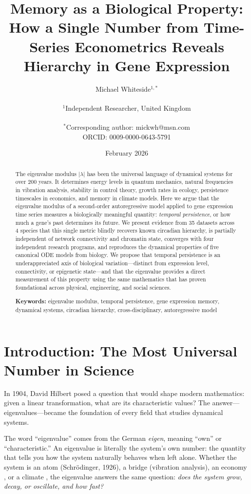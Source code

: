 \documentclass[11pt,letterpaper]{article}
\title{\textbf{Memory as a Biological Property: How a Single Number from Time-Series Econometrics Reveals Hierarchy in Gene Expression}}
\author{
Michael Whiteside$^{1,*}$ \\
\\
$^1$Independent Researcher, United Kingdom \\
\\
$^*$Corresponding author: mickwh@msn.com \\
ORCID: 0009-0000-0643-5791
}
\date{February 2026}
\begin{document}
\maketitle

\begin{abstract}
\noindent The eigenvalue modulus $|\lambda|$ has been the universal language of dynamical systems for over 200 years. It determines energy levels in quantum mechanics, natural frequencies in vibration analysis, stability in control theory, growth rates in ecology, persistence timescales in economics, and memory in climate models. Here we argue that the eigenvalue modulus of a second-order autoregressive model applied to gene expression time series measures a biologically meaningful quantity: \textit{temporal persistence}, or how much a gene's past determines its future. We present evidence from 35 datasets across 4 species that this single metric blindly recovers known circadian hierarchy, is partially independent of network connectivity and chromatin state, converges with four independent research programs, and reproduces the dynamical properties of five canonical ODE models from biology. We propose that temporal persistence is an underappreciated axis of biological variation---distinct from expression level, connectivity, or epigenetic state---and that the eigenvalue provides a direct measurement of this property using the same mathematics that has proven foundational across physical, engineering, and social sciences.

\noindent\textbf{Keywords:} eigenvalue modulus, temporal persistence, gene expression memory, dynamical systems, circadian hierarchy, cross-disciplinary, autoregressive model
\end{abstract}

\section{Introduction: The Most Universal Number in Science}

In 1904, David Hilbert posed a question that would shape modern mathematics: given a linear transformation, what are its characteristic values? The answer---eigenvalues---became the foundation of every field that studies dynamical systems.

The word ``eigenvalue'' comes from the German \textit{eigen}, meaning ``own'' or ``characteristic.'' An eigenvalue is literally the system's own number: the quantity that tells you how the system naturally behaves when left alone. Whether the system is an atom (Schr\"{o}dinger, 1926), a bridge (vibration analysis), an economy \citep{sims1980macroeconomics}, or a climate \citep{hasselmann1976stochastic}, the eigenvalue answers the same question: \textit{does the system grow, decay, or oscillate, and how fast?}
\end{document}
